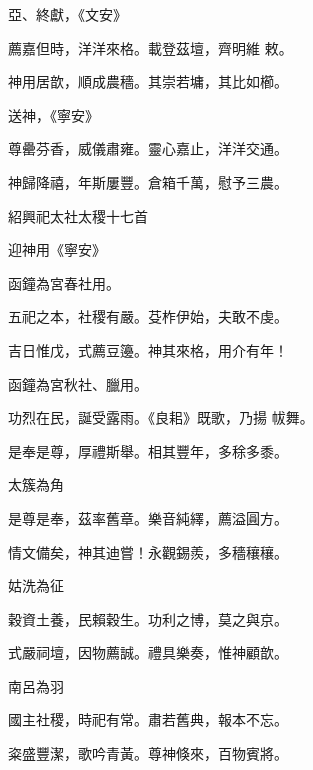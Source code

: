 \begin{pinyinscope}
 亞、終獻，《文安》



 薦嘉但時，洋洋來格。載登茲壇，齊明維
 敕。



 神用居歆，順成農穡。其崇若墉，其比如櫛。



 送神，《寧安》



 尊罍芬香，威儀肅雍。靈心嘉止，洋洋交通。



 神歸降禧，年斯屢豐。倉箱千萬，慰予三農。



 紹興祀太社太稷十七首



 迎神用《寧安》



 函鐘為宮春社用。



 五祀之本，社稷有嚴。芟柞伊始，夫敢不虔。



 吉日惟戊，式薦豆籩。神其來格，用介有年！



 函鐘為宮秋社、臘用。



 功烈在民，誕受露雨。《良耜》既歌，乃揚
 帗舞。



 是奉是尊，厚禮斯舉。相其豐年，多稌多黍。



 太簇為角



 是尊是奉，茲率舊章。樂音純繹，薦溢圓方。



 情文備矣，神其迪嘗！永觀錫羨，多穡穰穰。



 姑洗為征



 穀資土養，民賴穀生。功利之博，莫之與京。



 式嚴祠壇，因物薦誠。禮具樂奏，惟神顧歆。



 南呂為羽



 國主社稷，時祀有常。肅若舊典，報本不忘。



 粢盛豐潔，歌吟青黃。尊神倏來，百物賓將。




\end{pinyinscope}
